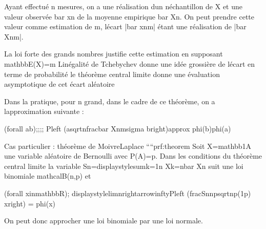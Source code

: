 \documentclass[letterpaper,10pt,french]{sphinxmanual}
\begin{document}
\begin{sphinxVerbatim}[commandchars=\\\{\}]
Ayant effectué \PYGZdl{}n\PYGZdl{} mesures, on a une réalisation d\PYGZsq{}un \PYGZdl{}n\PYGZdl{}\PYGZhy{}échantillon de \PYGZdl{}X\PYGZdl{} et une valeur observée \PYGZdl{}\PYGZbs{}bar x\PYGZus{}n\PYGZdl{} de la moyenne empirique \PYGZdl{}\PYGZbs{}bar X\PYGZus{}n\PYGZdl{}. On peut prendre cette valeur comme estimation de \PYGZdl{}m\PYGZdl{}, l\PYGZsq{}écart \PYGZdl{}|\PYGZbs{}bar x\PYGZus{}n\PYGZhy{}m|\PYGZdl{} étant une réalisation de \PYGZdl{}|\PYGZbs{}bar X\PYGZus{}n\PYGZhy{}m|\PYGZdl{}. 

\PYGZhy{} La loi forte des grands nombres justifie cette estimation en supposant  \PYGZdl{}\PYGZbs{}mathbb\PYGZob{}E\PYGZcb{}(X)=m\PYGZdl{}
\PYGZhy{} L\PYGZsq{}inégalité de Tchebychev donne une idée grossière de l\PYGZsq{}écart en terme de probabilité
\PYGZhy{} le théorème central limite donne une évaluation asymptotique de cet écart aléatoire


Dans la pratique, pour \PYGZdl{}n\PYGZdl{} grand, dans le cadre de ce théorème, on a l\PYGZsq{}approximation suivante :

\PYGZdl{}(\PYGZbs{}forall a\PYGZlt{}b)\PYGZbs{};\PYGZbs{};\PYGZbs{};\PYGZbs{}; P\PYGZbs{}left (a\PYGZbs{}sqrt\PYGZob{}n\PYGZcb{}\PYGZbs{}frac\PYGZob{}\PYGZbs{}bar X\PYGZus{}n\PYGZhy{}m\PYGZcb{}\PYGZob{}\PYGZbs{}sigma\PYGZcb{} \PYGZlt{}b\PYGZbs{}right)\PYGZbs{}approx \PYGZbs{}phi(b)\PYGZhy{}\PYGZbs{}phi(a)\PYGZdl{}

\PYGZsh{}\PYGZsh{}\PYGZsh{} Cas particulier : théorème de Moivre\PYGZhy{}Laplace
````\PYGZob{}prf:theorem\PYGZcb{}
Soit \PYGZdl{}X=\PYGZbs{}mathbb\PYGZob{}1\PYGZcb{}\PYGZus{}A\PYGZdl{}  une variable aléatoire de Bernoulli avec \PYGZdl{}P(A)=p\PYGZdl{}. Dans les conditions du théorème central limite la variable \PYGZdl{}S\PYGZus{}n=\PYGZbs{}displaystyle\PYGZbs{}sum\PYGZus{}\PYGZob{}k=1\PYGZcb{}\PYGZca{}n X\PYGZus{}k=n\PYGZbs{}bar X\PYGZus{}n\PYGZdl{} suit une loi binomiale \PYGZdl{}\PYGZbs{}mathcal\PYGZob{}B\PYGZcb{}(n,p)\PYGZdl{} et 

\PYGZdl{} (\PYGZbs{}forall x\PYGZbs{}in\PYGZbs{}mathbb\PYGZob{}R\PYGZcb{})\PYGZbs{}; \PYGZbs{}displaystyle\PYGZbs{}lim\PYGZus{}\PYGZob{}n\PYGZbs{}rightarrow\PYGZbs{}infty\PYGZcb{}P\PYGZbs{}left (\PYGZbs{}frac\PYGZob{}S\PYGZus{}n\PYGZhy{}np\PYGZcb{}\PYGZob{}\PYGZbs{}sqrt\PYGZob{}np(1\PYGZhy{}p)\PYGZcb{}\PYGZcb{} \PYGZlt{}x\PYGZbs{}right) = \PYGZbs{}phi(x)\PYGZdl{}
\end{sphinxVerbatim}

\sphinxAtStartPar
On peut donc approcher une loi binomiale par une loi normale.
\end{document}
